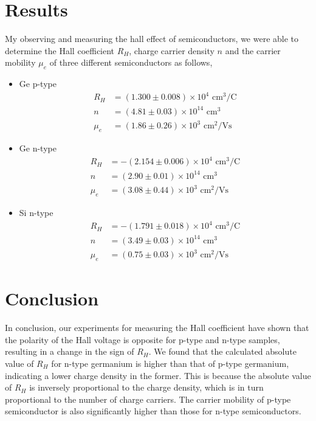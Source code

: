 \section{Results}
My observing and measuring the hall effect of semiconductors, we were able to determine the Hall coefficient $R_H$, charge carrier density $n$ and the carrier mobility $\mu_e$ of three different semiconductors as follows,

\begin{itemize}
    \item Ge p-type
    \begin{align*}
         R_H &= (1.300 \pm 0.008) \times 10^4 \text{ cm}^3/\text{C}\\
         n &= (4.81 \pm 0.03) \times 10^{14} \text{ cm}^3\\
         \mu_e &= (1.86 \pm 0.26) \times 10^3 \text{ cm}^2/\text{Vs}
    \end{align*}
    \item Ge n-type
    \begin{align*}
         R_H &= -(2.154 \pm 0.006) \times 10^4 \text{ cm}^3/\text{C}\\
         n &= (2.90 \pm 0.01) \times 10^{14} \text{ cm}^3\\
         \mu_e &= (3.08 \pm 0.44) \times 10^3 \text{ cm}^2/\text{Vs}
    \end{align*}
    \item Si n-type
    \begin{align*}
         R_H &= -(1.791 \pm 0.018) \times 10^4 \text{ cm}^3/\text{C}\\
         n &= (3.49 \pm 0.03) \times 10^{14} \text{ cm}^3\\
         \mu_e &= (0.75 \pm 0.03) \times 10^3 \text{ cm}^2/\text{Vs}
    \end{align*}
\end{itemize}

\section{Conclusion}

In conclusion, our experiments for measuring the Hall coefficient have shown that the polarity of the Hall voltage is opposite for p-type and n-type samples, resulting in a change in the sign of $R_H$. We found that the calculated absolute value of $R_H$ for n-type germanium is higher than
that of p-type germanium, indicating a lower charge density in the former. This is because the absolute value of $R_H$ is inversely proportional to the charge density, which is in turn proportional to the number of charge carriers.
The carrier mobility of p-type semiconductor is also significantly higher than those for n-type semiconductors.

